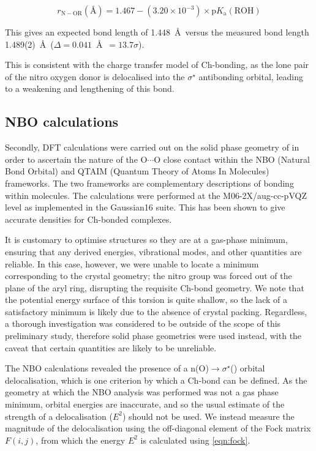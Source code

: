 \begin{refsection}
\begin{equation}
	r_{\mathrm{N-OR}} (\text{\AA}) = 1.467 - (3.20\times10^{-3}) \times \mathrm{p}K_{\mathrm{a}}(\mathrm{ROH})
	\label{eqn:scp}
\end{equation}

This gives an expected bond length of 1.448~\AA~versus the measured bond length 1.489(2)~\AA\ ($\Delta = 0.041$~\AA~$= 13.7\sigma$).

This is consistent with the charge transfer model of Ch-bonding, as the lone pair of the nitro oxygen donor is delocalised into the $\sigma^{\star}$ antibonding orbital, leading to a weakening and lengthening of this bond.\autocite{Reed1988}

\subsection{NBO calculations}
Secondly, DFT calculations were carried out on the solid phase geometry of  in order to ascertain the nature of the O$\cdots$O close contact within the NBO (Natural Bond Orbital) and QTAIM (Quantum Theory of Atoms In Molecules) frameworks.\autocite{Bader1991,NBO7}
The two frameworks are complementary descriptions of bonding within molecules.
The calculations were performed at the M06-2X/aug-cc-pVQZ level as implemented in the Gaussian16 suite.\autocite{gaussian16,Zhao2008,Woon1995}
This has been shown to give accurate densities for Ch-bonded complexes.\autocite{Kim2019}

It is customary to optimise structures so they are at a gas-phase minimum, ensuring that any derived energies, vibrational modes, and other quantities are reliable.
In this case, however, we were unable to locate a minimum corresponding to the crystal geometry; the nitro group was forced out of the plane of the aryl ring, disrupting the requisite Ch-bond geometry.
We note that the potential energy surface of this torsion is quite shallow, so the lack of a satisfactory minimum is likely due to the absence of crystal packing.
Regardless, a thorough investigation was considered to be outside of the scope of this preliminary study, therefore solid phase geometries were used instead, with the caveat that certain quantities are likely to be unreliable.

The NBO calculations revealed the presence of a n(O)$\rightarrow \sigma^{\star}$() orbital delocalisation, which is one criterion by which a Ch-bond can be defined.\autocite{Pascoe2017}
As the geometry at which the NBO analysis was performed was not a gas phase minimum, orbital energies are inaccurate, and so the usual estimate of the strength of a delocalisation ($E^2$) should not be used.
We instead measure the magnitude of the delocalisation using the off-diagonal element of the Fock matrix $F(i,j)$, from which the energy $E^2$ is calculated using \cref{eqn:fock}.


\end{refsection}
